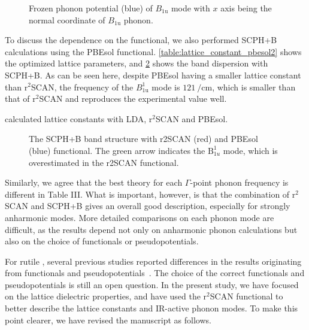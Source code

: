 \documentclass[luatex,onecolumn,showpacs,aps,preprint,prb,amsfonts,amsmath,amssymb,floatfix,groupedaddress, longbibliography]{revtex4-2}
\begin{document}
\begin{figure}[htb]
\centering
\caption{Frozen phonon potential (blue) of $B_{\mathrm{1u}}$ mode with $x$ axis being the normal coordinate of $B_{\mathrm{1u}}$ phonon.}
\label{fig:b1u2}
\end{figure}

To discuss the dependence on the functional, we also performed SCPH+B calculations using the PBEsol functional. \cref{table:lattice_constant_pbesol2} shows the optimized lattice parameters, and \cref{fig:pbesol2} shows the band dispersion with SCPH+B. As can be seen here, despite PBEsol having a smaller lattice constant than $\mathrm{r}^2$SCAN, the frequency of the $B_{\mathrm{1u}}^{1}$ mode is $\SI{121}{\per\cm}$, which is smaller than that of $\mathrm{r}^2$SCAN and reproduces the experimental value well.

\begin{table}[t] %
\centering
\caption{calculated lattice constants with LDA, $\mathrm{r}^2$SCAN and PBEsol.}
\label{table:lattice_constant_pbesol2}
\end{table}%

\begin{figure}[tb] %
\centering
\caption{The SCPH+B band structure with r2SCAN (red) and PBEsol (blue) functional. The green arrow indicates the $\mathrm{B}_{1u}^{1}$ mode, which is overestimated in the r2SCAN functional. }
\label{fig:pbesol2}
\end{figure}

Similarly, we agree that the best theory for each $\Gamma$-point phonon frequency is different in Table III. What is important, however, is that the combination of $\mathrm{r}^2$SCAN and SCPH+B gives an overall good description, especially for strongly anharmonic modes. More detailed comparisons on each phonon mode are difficult, as the results depend not only on anharmonic phonon calculations but also on the choice of functionals or pseudopotentials.


For rutile , several previous studies reported differences in the results originating from functionals and pseudopotentials~\cite{montanari2002Lattice,shojaee2009Firstprinciples,mitev2010Soft}. The choice of the correct functionals and pseudopotentials is still an open question. In the present study, we have focused on the lattice dielectric properties, and have used the $\mathrm{r}^2$SCAN functional to better describe the lattice constants and IR-active phonon modes. To make this point clearer, we have revised the manuscript as follows.
\end{document}

